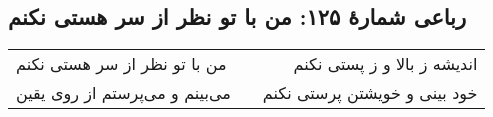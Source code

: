 \begin{center}
\section*{رباعی شمارهٔ ۱۲۵: من با تو نظر از سر هستی نکنم}
\label{sec:125}
\begin{longtable}{l p{0.5cm} r}
من با تو نظر از سر هستی نکنم
&&
اندیشه ز بالا و ز پستی نکنم
\\
می‌بینم و می‌پرستم از روی یقین
&&
خود بینی و خویشتن پرستی نکنم
\\
\end{longtable}
\end{center}
